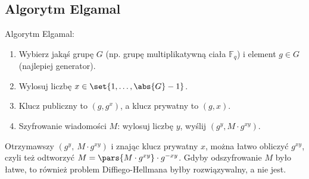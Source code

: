 \subsection{Algorytm Elgamal}
\begin{greyframe}
    Algorytm Elgamal:
    \begin{enumerate}
        \item Wybierz jakąś grupę \( G \) (np. grupę multiplikatywną ciała \( \mathbb{F}_q \)) i element \( g \in G \) \\ (najlepiej generator).
        \item Wylosuj liczbę \( x \in \set{1, \ldots, \abs{G}-1} \).
        \item Klucz publiczny to \( (g,g^x) \), a klucz prywatny to \( (g,x) \).
        \item Szyfrowanie wiadomości \( M \): wylosuj liczbę \( y \), wyślij \( (g^y, M \cdot g^{xy}) \). 
    \end{enumerate}
\end{greyframe}
Otrzymawszy \( (g^y, \ M \cdot g^{xy}) \) i znając klucz prywatny \( x \), można łatwo obliczyć \( g^{xy} \), czyli też odtworzyć \( M = \pars{M \cdot g^{xy}} \cdot g^{-xy} \).
Gdyby odszyfrowanie \( M \) było łatwe, to również problem Diffiego-Hellmana byłby rozwiązywalny, a nie jest.